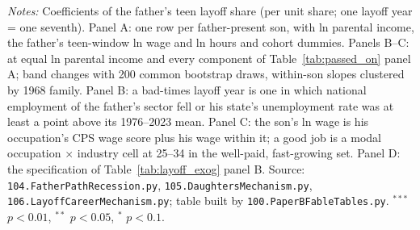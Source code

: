 \begin{table}[!htbp]
\centering
\addtocounter{table}{-1}
\caption{What kind of father, which layoffs, where in the son's career, and the daughters (PSID) (continued)}
\par\smallskip
\begin{minipage}{\textwidth}\footnotesize \textit{Notes:} Coefficients of the father's teen layoff share (per unit share; one layoff year = one seventh). Panel A: one row per father-present son, with ln parental income, the father's teen-window ln wage and ln hours and cohort dummies. Panels B--C: at equal ln parental income and every component of Table~\ref{tab:passed_on} panel A; band changes with 200 common bootstrap draws, within-son slopes clustered by 1968 family. Panel B: a bad-times layoff year is one in which national employment of the father's sector fell or his state's unemployment rate was at least a point above its 1976--2023 mean. Panel C: the son's ln wage is his occupation's CPS wage score plus his wage within it; a good job is a modal occupation $\times$ industry cell at 25--34 in the well-paid, fast-growing set. Panel D: the specification of Table~\ref{tab:layoff_exog} panel B. Source: \texttt{104.FatherPathRecession.py}, \texttt{105.DaughtersMechanism.py}, \texttt{106.LayoffCareerMechanism.py}; table built by \texttt{100.PaperBFableTables.py}. $^{***}$ $p<0.01$, $^{**}$ $p<0.05$, $^{*}$ $p<0.1$.\end{minipage}
\end{table}

